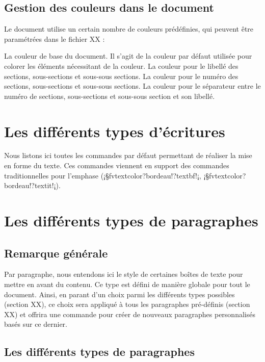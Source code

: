 \documentclass[11pt,a4paper,rgb]{report}
\begin{document}
\subsection{Gestion des couleurs dans le document}
Le document utilise un certain nombre de couleurs prédéfinies, qui peuvent être paramétrées dans le fichier XX :
\begin{itemize}
	La couleur de base du document. Il s'agit de la couleur par défaut utilisée pour colorer les éléments nécessitant de la couleur.
	La couleur pour le libellé des sections, sous-sections et sous-sous sections.
	La couleur pour le numéro des sections, sous-sections et sous-sous sections.
	La couleur pour le séparateur entre le numéro de sections, sous-sections et sous-sous section et son libellé.
\end{itemize}

\section{Les différents types d'écritures}
Nous listons ici toutes les commandes par défaut permettant de réaliser la mise en forme du texte. Ces commandes viennent en support des commandes traditionnelles pour l'emphase (\inCodeStub¡§fvtextcolor?bordeau!?textbf!¡, \inCodeStub¡§fvtextcolor?bordeau!?textit!¡).

\section{Les différents types de paragraphes}
\subsection{Remarque générale}
Par paragraphe, nous entendons ici le style de certaines boîtes de texte pour mettre en avant du contenu. Ce type est défini de manière globale pour tout le document. Ainsi, en parant d'un choix parmi les différents types possibles (section XX), ce choix sera appliqué à tous les paragraphes pré-définis (section XX) et offrira une commande pour créer de nouveaux paragraphes personnalisés basés sur ce dernier.

\subsection{Les différents types de paragraphes}
\end{document}

